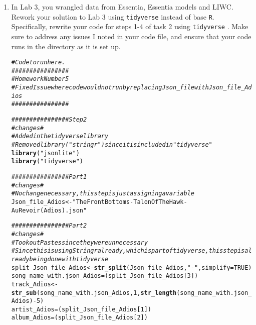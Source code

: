 \documentclass{article}\usepackage[]{graphicx}\usepackage[]{xcolor}
\makeatletter
\newcommand{\hlnum}[1]{\textcolor[rgb]{0.686,0.059,0.569}{#1}}%
\newcommand{\hlsng}[1]{\textcolor[rgb]{0.192,0.494,0.8}{#1}}%
\newcommand{\hlcom}[1]{\textcolor[rgb]{0.678,0.584,0.686}{\textit{#1}}}%
\newcommand{\hlopt}[1]{\textcolor[rgb]{0,0,0}{#1}}%
\newcommand{\hldef}[1]{\textcolor[rgb]{0.345,0.345,0.345}{#1}}%
\newcommand{\hlkwb}[1]{\textcolor[rgb]{0.69,0.353,0.396}{#1}}%
\newcommand{\hlkwc}[1]{\textcolor[rgb]{0.333,0.667,0.333}{#1}}%
\newcommand{\hlkwd}[1]{\textcolor[rgb]{0.737,0.353,0.396}{\textbf{#1}}}%
\newenvironment{kframe}{%
 \def\at@end@of@kframe{}%
 \ifinner\ifhmode%
  \def\at@end@of@kframe{\end{minipage}}%
  \begin{minipage}{\columnwidth}%
 \fi\fi%
 \def\FrameCommand##1{\hskip\@totalleftmargin \hskip-\fboxsep
 \colorbox{shadecolor}{##1}\hskip-\fboxsep
     \hskip-\linewidth \hskip-\@totalleftmargin \hskip\columnwidth}%
 \MakeFramed {\advance\hsize-\width
   \@totalleftmargin\z@ \linewidth\hsize
   \@setminipage}}%
 {\par\unskip\endMakeFramed%
 \at@end@of@kframe}
\newenvironment{knitrout}{}{} %
\makeatother
\begin{document}
\begin{enumerate}
\item In Lab 3, you wrangled data from Essentia, Essentia models and LIWC. Rework your 
solution to Lab 3 using \texttt{tidyverse} \citep{tidyverse} instead of base \texttt{R}.
Specifically, rewrite your code for steps 1-4 of task 2 using \texttt{tidyverse} \citep{tidyverse}. 
Make sure to address any issues I noted in your code file, and ensure that your code 
runs in the directory as it is set up.
\begin{knitrout}\scriptsize
{}\color{fgcolor}\begin{kframe}
\begin{alltt}
\hlcom{# Code to run here.}
\hlcom{################ }
\hlcom{#Homework Number 5}
\hlcom{#Fixed Issue where code would not run by replacing Json_file with Json_file_Adios}
\hlcom{################ }

\hlcom{################ Step 2}
\hlcom{#changes#}
\hlcom{#Added in the tidyverse library}
\hlcom{#Removed library("stringr") since it is included in "tidyverse"}
\hlkwd{library}\hldef{(}\hlsng{"jsonlite"}\hldef{)}
\hlkwd{library}\hldef{(}\hlsng{"tidyverse"}\hldef{)}

\hlcom{################ Part 1}
\hlcom{#changes#}
\hlcom{#No change necessary, this step is just assigning a variable }
\hldef{Json_file_Adios} \hlkwb{<-} \hlsng{"The Front Bottoms-Talon Of The Hawk-Au Revoir (Adios).json"}

\hlcom{################ Part 2}
\hlcom{#changes#}
\hlcom{#Took out Pastes since they were unnecessary}
\hlcom{#Since this is using Stringr already, which is part of tidyverse, this step is already being done with tidyverse}
\hldef{split_Json_file_Adios} \hlkwb{<-} \hlkwd{str_split}\hldef{(Json_file_Adios,} \hlsng{"-"}\hldef{,} \hlkwc{simplify} \hldef{=} \hlnum{TRUE}\hldef{)}
\hldef{song_name_with.json_Adios} \hlkwb{=} \hldef{(split_Json_file_Adios[}\hlnum{3}\hldef{])}
\hldef{track_Adios} \hlkwb{<-} \hlkwd{str_sub}\hldef{(song_name_with.json_Adios,} \hlnum{1}\hldef{,} \hlkwd{str_length}\hldef{(song_name_with.json_Adios)} \hlopt{-} \hlnum{5}\hldef{)}
\hldef{artist_Adios} \hlkwb{=} \hldef{(split_Json_file_Adios[}\hlnum{1}\hldef{])}
\hldef{album_Adios} \hlkwb{=} \hldef{(split_Json_file_Adios[}\hlnum{2}\hldef{])}


\end{alltt}
\end{kframe}
\end{knitrout}
\end{enumerate}
\end{document}
